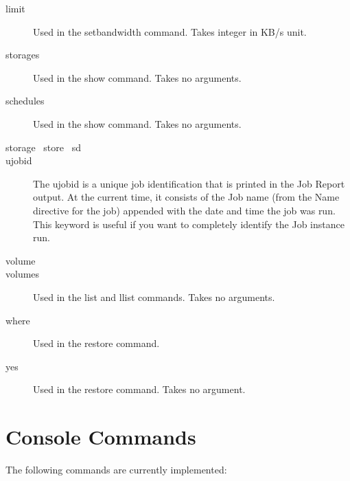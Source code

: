 \begin{description}
\item[limit]
  Used in the setbandwidth command. Takes integer in KB/s unit.
\item [storages]
  Used in the show command. Takes no arguments.
\item [schedules]
  Used in the show command. Takes no arguments.
\item [storage \textbar\ store \textbar\ sd]
\item [ujobid]
  The ujobid is a unique job identification that is printed
  in the Job Report output. At the current time, it consists
  of the Job name (from the Name directive for the job) appended
  with the date and time the job was run. This keyword is useful
  if you want to completely identify the Job instance run.
\item [volume]
\item [volumes]
  Used in the list and llist commands. Takes no arguments.
\item [where]
  Used in the restore command.
\item [yes]
  Used in the restore command. Takes no argument.
\end{description}

\section{Console Commands}

The following commands are currently implemented:

